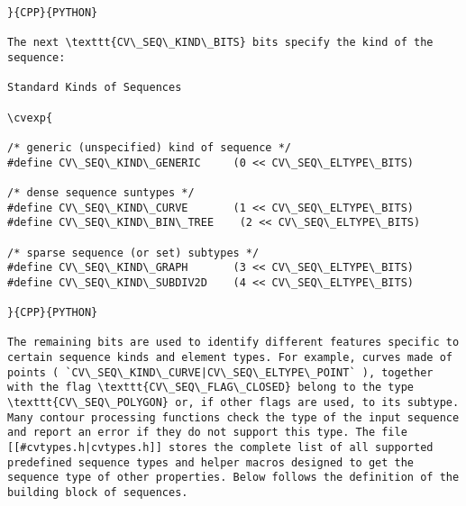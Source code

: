 \begin{verbatim}
}{CPP}{PYTHON}

The next \texttt{CV\_SEQ\_KIND\_BITS} bits specify the kind of the sequence:

Standard Kinds of Sequences

\cvexp{

/* generic (unspecified) kind of sequence */
#define CV\_SEQ\_KIND\_GENERIC     (0 << CV\_SEQ\_ELTYPE\_BITS)

/* dense sequence suntypes */
#define CV\_SEQ\_KIND\_CURVE       (1 << CV\_SEQ\_ELTYPE\_BITS)
#define CV\_SEQ\_KIND\_BIN\_TREE    (2 << CV\_SEQ\_ELTYPE\_BITS)

/* sparse sequence (or set) subtypes */
#define CV\_SEQ\_KIND\_GRAPH       (3 << CV\_SEQ\_ELTYPE\_BITS)
#define CV\_SEQ\_KIND\_SUBDIV2D    (4 << CV\_SEQ\_ELTYPE\_BITS)

}{CPP}{PYTHON}

The remaining bits are used to identify different features specific to certain sequence kinds and element types. For example, curves made of points ( `CV\_SEQ\_KIND\_CURVE|CV\_SEQ\_ELTYPE\_POINT` ), together with the flag \texttt{CV\_SEQ\_FLAG\_CLOSED} belong to the type \texttt{CV\_SEQ\_POLYGON} or, if other flags are used, to its subtype. Many contour processing functions check the type of the input sequence and report an error if they do not support this type. The file [[#cvtypes.h|cvtypes.h]] stores the complete list of all supported predefined sequence types and helper macros designed to get the sequence type of other properties. Below follows the definition of the building block of sequences.


\end{verbatim}
\label{CvSeqBlock}
